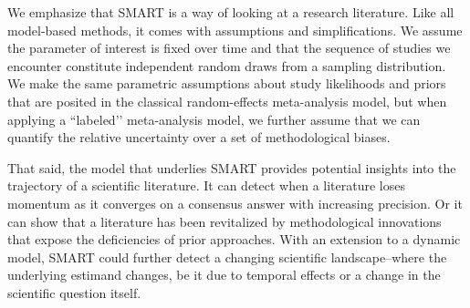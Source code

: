 We emphasize that SMART is a way of looking at a research literature.
Like all model-based methods, it comes with assumptions and
simplifications. We assume the parameter of interest is fixed over
time and that the sequence of studies we encounter constitute independent random draws from a sampling distribution.  We make the same parametric assumptions about study
likelihoods and priors that are posited in the classical
random-effects meta-analysis model, but when applying a ``labeled’’ meta-analysis model, we further assume that we can quantify the relative uncertainty over a set of 
methodological biases. 

That said, the model that underlies SMART provides potential insights
into the trajectory of a scientific literature. It can detect when a
literature loses momentum as it converges on a consensus answer with
increasing precision. Or it can show that a literature has been
revitalized by methodological innovations that expose the deficiencies
of prior approaches. With an extension to a dynamic model, SMART could further detect a changing scientific landscape--where the underlying estimand changes, be it due to temporal effects or a change in the scientific question itself.
